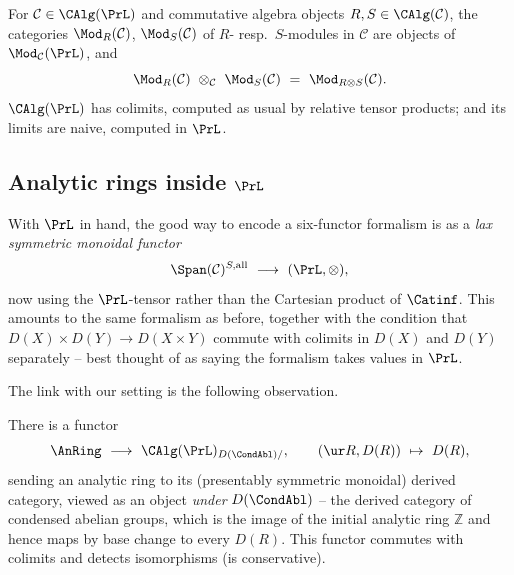 \begin{example}
\label{ex:17:mod-tensor}
For $\mathcal C\in\CAlg(\PrL)$ and commutative algebra objects $R,S\in\CAlg(\mathcal C)$, the
categories $\Mod_{R}(\mathcal C)$, $\Mod_{S}(\mathcal C)$ of $R$- resp.\ $S$-modules in
$\mathcal C$ are objects of $\Mod_{\mathcal C}(\PrL)$, and
\begin{equation}
\label{eq:17:mod-tensor}
\Mod_{R}(\mathcal C)\ \otimes_{\mathcal C}\ \Mod_{S}(\mathcal C)\ =\ \Mod_{R\otimes S}(\mathcal C).
\end{equation}
$\CAlg(\PrL)$ has colimits, computed as usual by relative tensor products; and its limits are
naive, computed in $\PrL$.
\end{example}

\subsection{Analytic rings inside \texorpdfstring{$\PrL$}{PrL}}
\label{subsec:17:anring-PrL}

With $\PrL$ in hand, the good way to encode a six-functor formalism is as a \emph{lax
symmetric monoidal functor}
\begin{equation*}
\Span(\mathcal C)^{S,\mathrm{all}}\ \longrightarrow\ (\PrL,\otimes),
\end{equation*}
now using the $\PrL$-tensor rather than the Cartesian product of $\Catinf$. This amounts
to the same formalism as before, together with the condition that
$D(X)\times D(Y)\to D(X\times Y)$ commute with colimits in $D(X)$ and $D(Y)$ separately --
best thought of as saying the formalism takes values in $\PrL$.

The link with our setting is the following observation.

\begin{proposition}
\label{prop:17:anring-to-PrL}
There is a functor
\begin{equation}
\label{eq:17:anring-to-PrL}
\AnRing\ \longrightarrow\ \CAlg(\PrL)_{D(\CondAbl)/},\qquad
(\ur R, D(R))\ \mapsto\ D(R),
\end{equation}
sending an analytic ring to its (presentably symmetric monoidal) derived category, viewed
as an object \emph{under} $D(\CondAbl)$ -- the derived category of condensed abelian groups,
which is the image of the initial analytic ring $\mathbb{Z}$ and hence maps by base change to
every $D(R)$. This functor commutes with colimits and detects isomorphisms (is
conservative).
\end{proposition}

